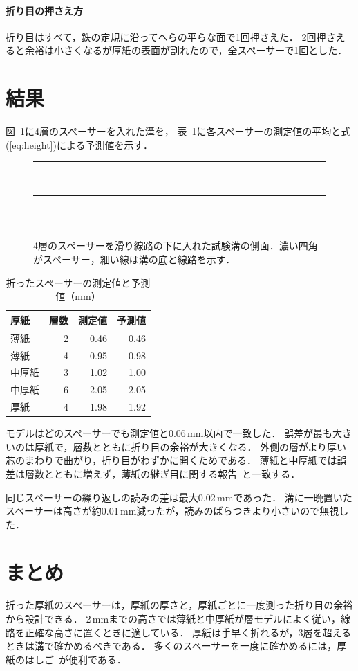\documentclass[submit]{ipsj}
\begin{document}
\paragraph{折り目の押さえ方}
折り目はすべて，鉄の定規に沿ってへらの平らな面で1回押さえた．
2回押さえると余裕は小さくなるが厚紙の表面が割れたので，全スペーサーで1回とした．

\section{結果}\label{sec:results}
図~\ref{fig:slot}に4層のスペーサーを入れた溝を，
表~\ref{tab:heights}に各スペーサーの測定値の平均と式(\ref{eq:height})による予測値を示す．

\begin{figure}[t]
\centering
\rule{0.8\linewidth}{0.4pt}\\[2pt]
\rule{0.6\linewidth}{18mm}\\[2pt]
\rule{0.8\linewidth}{0.4pt}
\caption{4層のスペーサーを滑り線路の下に入れた試験溝の側面．濃い四角がスペーサー，細い線は溝の底と線路を示す．}
\label{fig:slot}
\end{figure}

\begin{table}[t]
\caption{折ったスペーサーの測定値と予測値（mm）}
\label{tab:heights}
\centering
\begin{tabular}{lrrr}
\hline
厚紙 & 層数 & 測定値 & 予測値 \\
\hline
薄紙 & 2 & 0.46 & 0.46 \\
薄紙 & 4 & 0.95 & 0.98 \\
中厚紙 & 3 & 1.02 & 1.00 \\
中厚紙 & 6 & 2.05 & 2.05 \\
厚紙 & 4 & 1.98 & 1.92 \\
\hline
\end{tabular}
\end{table}

モデルはどのスペーサーでも測定値と0.06\,mm以内で一致した．
誤差が最も大きいのは厚紙で，層数とともに折り目の余裕が大きくなる．
外側の層がより厚い芯のまわりで曲がり，折り目がわずかに開くためである．
薄紙と中厚紙では誤差は層数とともに増えず，薄紙の継ぎ目に関する報告~\cite{glue22}と一致する．

同じスペーサーの繰り返しの読みの差は最大0.02\,mmであった．
溝に一晩置いたスペーサーは高さが約0.01\,mm減ったが，読みのばらつきより小さいので無視した．

\section{まとめ}\label{sec:conclusion}
折った厚紙のスペーサーは，厚紙の厚さと，厚紙ごとに一度測った折り目の余裕から設計できる．
2\,mmまでの高さでは薄紙と中厚紙が層モデルによく従い，線路を正確な高さに置くときに適している．
厚紙は手早く折れるが，3層を超えるときは溝で確かめるべきである．
多くのスペーサーを一度に確かめるには，厚紙のはしご~\cite{window21}が便利である．
\end{document}
